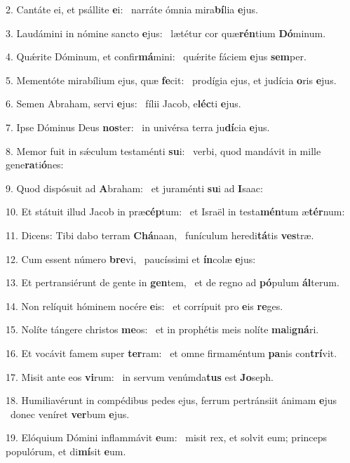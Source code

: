 2. Cantáte ei, et psállite \textbf{e}i: \ast\  narráte ómnia mira\textbf{bí}lia \textbf{e}jus.\

3. Laudámini in nómine sancto \textbf{e}jus: \ast\  lætétur cor quæ\textbf{rén}tium \textbf{Dó}minum.\

4. Quǽrite Dóminum, et confir\textbf{má}mini: \ast\  quǽrite fáciem \textbf{e}jus \textbf{sem}per.\

5. Mementóte mirabílium ejus, quæ \textbf{fe}cit: \ast\  prodígia ejus, et judícia \textbf{o}ris \textbf{e}jus.\

6. Semen Abraham, servi \textbf{e}jus: \ast\  fílii Jacob, e\textbf{léc}ti \textbf{e}jus.\

7. Ipse Dóminus Deus \textbf{nos}ter: \ast\  in univérsa terra ju\textbf{dí}cia \textbf{e}jus.\

8. Memor fuit in sǽculum testaménti \textbf{su}i: \ast\  verbi, quod mandávit in mille gene\textbf{ra}ti\textbf{ó}nes:\

9. Quod dispósuit ad \textbf{A}braham: \ast\  et juraménti \textbf{su}i ad \textbf{I}saac:\

10. Et státuit illud Jacob in præ\textbf{cép}tum: \ast\  et Israël in testa\textbf{mén}tum æ\textbf{tér}num:\

11. Dicens: Tibi dabo terram \textbf{Chá}naan, \ast\  funículum heredi\textbf{tá}tis \textbf{ves}træ.\

12. Cum essent número \textbf{bre}vi, \ast\  paucíssimi et \textbf{ín}colæ \textbf{e}jus:\

13. Et pertransiérunt de gente in \textbf{gen}tem, \ast\  et de regno ad \textbf{pó}pulum \textbf{ál}terum.\

14. Non relíquit hóminem nocére \textbf{e}is: \ast\  et corrípuit pro \textbf{e}is \textbf{re}ges.\

15. Nolíte tángere christos \textbf{me}os: \ast\  et in prophétis meis nolíte \textbf{ma}li\textbf{gná}ri.\

16. Et vocávit famem super \textbf{ter}ram: \ast\  et omne firmaméntum \textbf{pa}nis con\textbf{trí}vit.\

17. Misit ante eos \textbf{vi}rum: \ast\  in servum venúmda\textbf{tus} est \textbf{Jo}seph.\

18. Humiliavérunt in compédibus pedes ejus, ferrum pertránsiit ánimam \textbf{e}jus \ast\  donec veníret \textbf{ver}bum \textbf{e}jus.\

19. Elóquium Dómini inflammávit \textbf{e}um: \ast\  misit rex, et solvit eum; princeps populórum, et di\textbf{mí}sit \textbf{e}um.\

